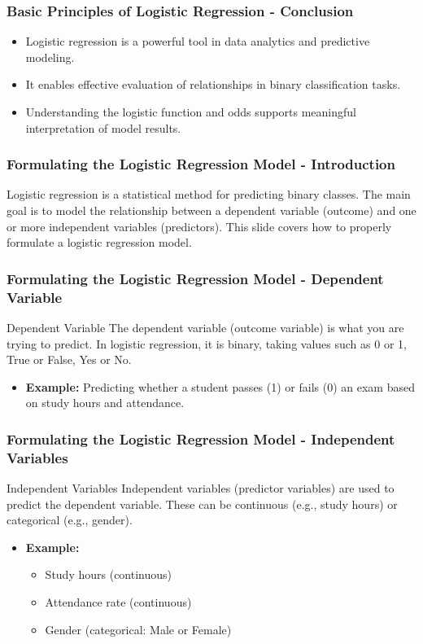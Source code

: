 \documentclass[aspectratio=169]{beamer}
\begin{document}
\begin{frame}[fragile]
    \frametitle{Basic Principles of Logistic Regression - Conclusion}
    \begin{itemize}
        \item Logistic regression is a powerful tool in data analytics and predictive modeling.
        \item It enables effective evaluation of relationships in binary classification tasks.
        \item Understanding the logistic function and odds supports meaningful interpretation of model results.
    \end{itemize}
\end{frame}

\begin{frame}[fragile]
    \frametitle{Formulating the Logistic Regression Model - Introduction}
    Logistic regression is a statistical method for predicting binary classes. The main goal is to model the relationship between a dependent variable (outcome) and one or more independent variables (predictors). This slide covers how to properly formulate a logistic regression model.
\end{frame}

\begin{frame}[fragile]
    \frametitle{Formulating the Logistic Regression Model - Dependent Variable}
    \begin{block}{Dependent Variable}
        The dependent variable (outcome variable) is what you are trying to predict. 
        In logistic regression, it is binary, taking values such as 0 or 1, True or False, Yes or No.
    \end{block}
    \begin{itemize}
        \item \textbf{Example:} Predicting whether a student passes (1) or fails (0) an exam based on study hours and attendance.
    \end{itemize}
\end{frame}

\begin{frame}[fragile]
    \frametitle{Formulating the Logistic Regression Model - Independent Variables}
    \begin{block}{Independent Variables}
        Independent variables (predictor variables) are used to predict the dependent variable. 
        These can be continuous (e.g., study hours) or categorical (e.g., gender).
    \end{block}
    \begin{itemize}
        \item \textbf{Example:} 
        \begin{itemize}
            \item Study hours (continuous)
            \item Attendance rate (continuous)
            \item Gender (categorical: Male or Female)
        \end{itemize}
    \end{itemize}
\end{frame}
\end{document}
